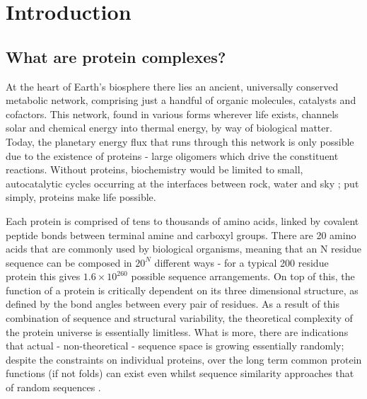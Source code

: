 \documentclass[a4paper,11pt,twoside,openright]{scrbook}
\begin{document}
\chapter{Introduction}

\section{What are protein complexes?}
At the heart of Earth's biosphere there lies an ancient, universally conserved metabolic network, comprising just a handful of organic molecules, catalysts and cofactors. This network, found in various forms wherever life exists, channels solar and chemical energy into thermal energy, by way of biological matter. Today, the planetary energy flux that runs through this network is only possible due to the existence of proteins - large oligomers which drive the constituent reactions. Without proteins, biochemistry would be limited to small, autocatalytic cycles occurring at the interfaces between rock, water and sky \cite{Smith2016}; put simply, proteins make life possible.

Each protein is comprised of tens to thousands of amino acids, linked by covalent peptide bonds between terminal amine and carboxyl groups. There are 20 amino acids that are commonly used by biological organisms, meaning that an N residue sequence can be composed in \(20^{N}\) different ways - for a typical 200 residue protein this gives \(1.6 \times 10^{260}\) possible sequence arrangements. On top of this, the function of a protein is critically dependent on its three dimensional structure, as defined by the bond angles between every pair of residues. As a result of this combination of sequence and structural variability, the theoretical complexity of the protein universe is essentially limitless. What is more, there are indications that actual - non-theoretical - sequence space is growing essentially randomly; despite the constraints on individual proteins, over the long term common protein functions (if not folds) can exist even whilst sequence similarity approaches that of random sequences \cite{Larson2002,Povolotskaya2010}.

\end{document}

